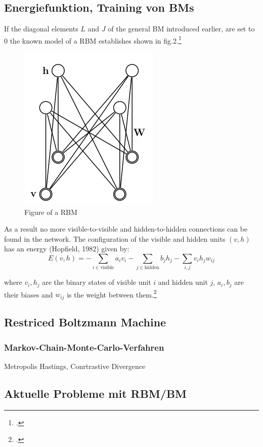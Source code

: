 \subsection{Energiefunktion, Training von BMs}


If the diagonal elements \( L \) and \( J \) of the general \ac{BM} introduced earlier, are set to 0 the known model of a \ac{RBM} establishes shown in fig.2.\footcite[Vgl.][449]{salakhutdinovDeepBoltzmannMachines2009}

\begin{figure}[H]
    \centering
    \includegraphics[width=0.25\linewidth]{graphics/RBM_Modell.png}
    \caption{Figure of a \ac{RBM}}
\end{figure}
As a result no more visible-to-visible and hidden-to-hidden connections can be found in the network.
The configuration of the visible and hidden units \( (v, h) \) has an energy (Hopfield, 1982) given by:
\begin{equation}
E(v, h) = - \sum_{i \in \text{visible}} a_i v_i - \sum_{j \in \text{hidden}} b_j h_j - \sum_{i,j} v_i h_j w_{ij}
\end{equation}

where \( v_i, h_j \) are the binary states of visible unit \( i \) and hidden unit \( j \), \( a_i, b_j \) are their biases and \( w_{ij} \) is the weight between them.\footcite[Vgl.][3-4]{hintonPracticalGuideTraining2012a}

\subsection{Restriced Boltzmann Machine}


\subsubsection{Markov-Chain-Monte-Carlo-Verfahren}
Metropolis Hastings,
Conrtrastive Divergence

\subsection{Aktuelle Probleme mit RBM/BM}


